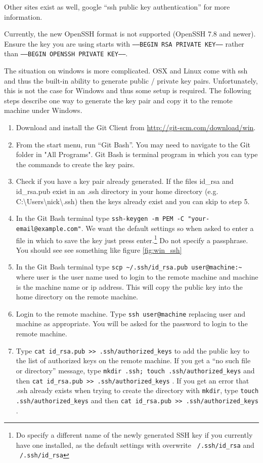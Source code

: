 \documentclass[11pt]{amsart}
\begin{document}
\noindent
Other sites exist as well,  google ``ssh public key authentication'' for more information.

Currently, the new OpenSSH format is not supported (OpenSSH 7.8 and newer). Ensure the key you are using starts with {\tt-----BEGIN RSA PRIVATE KEY-----} rather than {\tt-----BEGIN OPENSSH PRIVATE KEY-----}.

The situation on windows is more complicated. OSX and Linux come with ssh and thus the built-in ability to generate public / private key pairs. Unfortunately, this is not the case for Windows and thus some setup is required. The following steps describe one way to generate the key pair and copy it to the remote machine under Windows.

\begin{enumerate}
\item Download and install the Git Client from \href{http://git-scm.com/download/win}{http://git-scm.com/download/win}.
\item From the start menu, run ``Git Bash''. You may need to navigate to the Git folder in "All Programs". Git Bash is terminal program in which you can type the commands to create the key pairs.
\item Check if you have a key pair already generated. If the files id\_rsa and id\_rsa.pub exist in an .ssh directory in your home directory (e.g. C:\textbackslash Users\textbackslash nick\textbackslash .ssh) then the keys already exist and you can skip to step 5.
\item In the Git Bash terminal type {\tt ssh-keygen -m PEM -C "your-email@example.com"}. We want the default settings so when asked to enter a file in which to save the key just press enter.\footnote{Do specify a different name of the newly generated SSH key if you currently have one installed, as the default settings with overwrite {\tt~/.ssh/id\_rsa} and {\tt~/.ssh/id\_rsa}} Do not specify a passphrase. You should see see something like figure \ref{fig:win_ssh}
\item In the Git Bash terminal type {\tt scp \textasciitilde/.ssh/id\_rsa.pub user@machine:\textasciitilde} where user is the user name used to login to the remote machine and machine is the machine name or ip address. This will copy the public key into the home directory on the remote machine.
\item Login to the remote machine. Type {\tt ssh user@machine} replacing user and machine as appropriate. You will be asked for the password to login to the remote machine.
\item Type {\tt cat id\_rsa.pub >> .ssh/authorized\_keys} to add the public key to the list of authorized keys on the remote machine. If you get a ``no such file or directory'' message, type {\tt mkdir .ssh; touch .ssh/authorized\_keys} and then  {\tt cat id\_rsa.pub >> .ssh/authorized\_keys} . If you get an error that .ssh already exists when trying to create the directory with {\tt mkdir}, type {\tt touch .ssh/authorized\_keys} and then  {\tt cat id\_rsa.pub >> .ssh/authorized\_keys} .

\end{enumerate}
\end{document}
